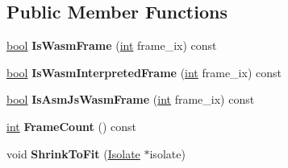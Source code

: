 \subsection*{Public Member Functions}
\begin{DoxyCompactItemize}
\item 
\mbox{\label{classv8_1_1internal_1_1FrameArray_a3db1bc48e7b856730a45b323e81b661f}} 
\mbox{\hyperlink{classbool}{bool}} {\bfseries Is\+Wasm\+Frame} (\mbox{\hyperlink{classint}{int}} frame\+\_\+ix) const
\item 
\mbox{\label{classv8_1_1internal_1_1FrameArray_a43e3740f14fb7c8286abd4596a9c7152}} 
\mbox{\hyperlink{classbool}{bool}} {\bfseries Is\+Wasm\+Interpreted\+Frame} (\mbox{\hyperlink{classint}{int}} frame\+\_\+ix) const
\item 
\mbox{\label{classv8_1_1internal_1_1FrameArray_a479d40c2f922cc1baabb319158118e4e}} 
\mbox{\hyperlink{classbool}{bool}} {\bfseries Is\+Asm\+Js\+Wasm\+Frame} (\mbox{\hyperlink{classint}{int}} frame\+\_\+ix) const
\item 
\mbox{\label{classv8_1_1internal_1_1FrameArray_a88f51e76bd736059aa3f69b5b33ce450}} 
\mbox{\hyperlink{classint}{int}} {\bfseries Frame\+Count} () const
\item 
\mbox{\label{classv8_1_1internal_1_1FrameArray_a2bd377e1e6949ded6dfefe87077cb85f}} 
void {\bfseries Shrink\+To\+Fit} (\mbox{\hyperlink{classv8_1_1internal_1_1Isolate}{Isolate}} $\ast$isolate)
\end{DoxyCompactItemize}
